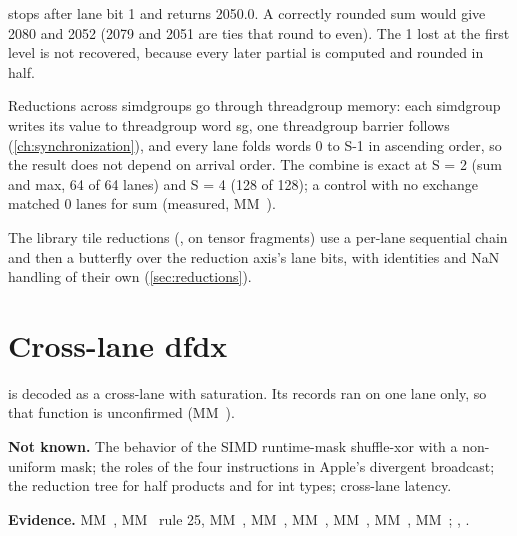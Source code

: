  stops after lane bit 1 and returns 2050.0. A correctly rounded sum would give 2080 and 2052 (2079 and 2051 are
ties that round to even). The 1 lost at the first level is not recovered, because every later partial is computed and
rounded in half.

Reductions across simdgroups go through threadgroup memory: each simdgroup writes its value to threadgroup word sg, one
threadgroup barrier follows (\cref{ch:synchronization}), and every lane folds words 0 to S-1 in ascending order, so the result does not depend on arrival
order. The combine is exact at S = 2 (sum and max, 64 of 64 lanes) and S = 4 (128 of 128); a control with no exchange matched 0 lanes for sum
(measured, MM~).

The library tile reductions (,  on tensor fragments) use a per-lane sequential chain and then a
butterfly over the reduction axis's lane bits, with identities and NaN handling of their own (\cref{sec:reductions}).

\section{Cross-lane dfdx}\label{sec:other-cross-lane-forms}

 is decoded as a cross-lane  with saturation. Its records ran on one lane only, so that function is
unconfirmed (MM~).

\textbf{Not known.} The behavior of the SIMD runtime-mask
shuffle-xor with a non-uniform mask; the roles of the four instructions in Apple's divergent broadcast; the reduction tree for half  products and
for int types; cross-lane latency.

\textbf{Evidence.} MM~, MM~ rule 25, MM~, MM~, MM~, MM~, MM~, MM~;
, .
